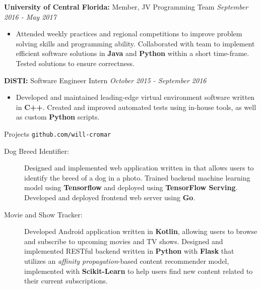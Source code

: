 \documentclass[letterpaper,11pt,oneside]{article}
\newcommand{\resheader}[2][]{
  \vspace{9pt}
  {\LARGE #2} #1
  \\
}
\newcommand{\ressubheader}[3][]{
  \vspace{6pt}
  {\textbf{#2} #1} \hfill \emph{#3}
  \\
}
\newcommand{\resskill}[1]{\textbf{#1}}
\begin{document}
\ressubheader[Member, JV Programming Team]{University of Central Florida:}{September 2016 - May 2017}
\begin{itemize}
  \item Attended weekly practices and regional competitions to improve problem solving skills and programming ability. Collaborated with team to implement efficient software solutions in \resskill{Java} and \resskill{Python} within a short time-frame. Tested solutions to ensure correctness.
\end{itemize}

\ressubheader[Software Engineer Intern]{DiSTI:}{October 2015 - September 2016}
\begin{itemize}
  \item Developed and maintained leading-edge virtual environment software written in \resskill{C++}. Created and improved automated tests using in-house tools, as well as custom \resskill{Python} scripts.
\end{itemize}

\resheader[\hfill \texttt{github.com/will-cromar}]{Projects}
\begin{description}
  \item [Dog Breed Identifier:] Designed and implemented web application written in that allows users to identify the breed of a dog in a photo. Trained backend machine learning model using \resskill{Tensorflow} and deployed using \resskill{TensorFlow Serving}. Developed and deployed frontend web server using \resskill{Go}.
  \item [Movie and Show Tracker:] Developed Android application written in \resskill{Kotlin}, allowing users to browse and subscribe to upcoming movies and TV shows. Designed and implemented RESTful backend written in \resskill{Python} with \resskill{Flask} that utilizes an \emph{affinity propagation}-based content recommender model, implemented with \resskill{Scikit-Learn} to help users find new content related to their current subscriptions.
\end{description}    
\end{document}

